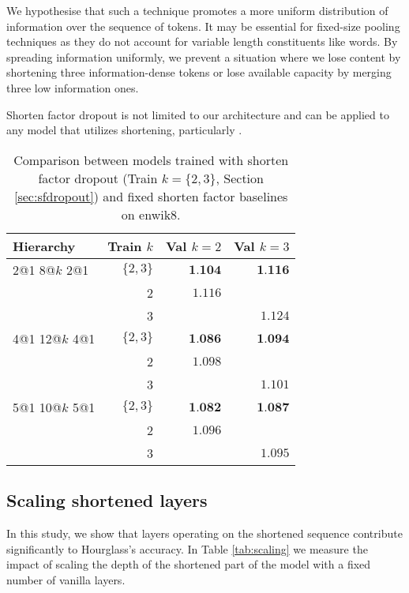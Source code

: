 \documentclass[11pt]{article}
\begin{document}
We hypothesise that such a technique promotes a more uniform distribution of information over the sequence of tokens. It may be essential for fixed-size pooling techniques as they do not account for variable length constituents like words. By spreading information uniformly, we prevent a situation where we lose content by shortening three information-dense tokens or lose available capacity by merging three low information ones.

Shorten factor dropout is not limited to our architecture and can be applied to any model that utilizes shortening, particularly \cite{dai2020funneltransformer}.

\begin{table}[ht!]
\small
\centering
\setlength{\tabcolsep}{0.8em}
\begin{tabular}{lrrr}
\hline
Hierarchy & Train $k$ & Val $k=2$ & Val $k=3$ \\
\hline
2@1 8@$k$ 2@1 & $\{2,3\}$ & $\textbf{1.104}$ & $\textbf{1.116}$ \\
              & 2 & $1.116$ &         \\
              & 3 &         & $1.124$ \\
\hline
4@1 12@$k$ 4@1 & $\{2,3\}$ & $\textbf{1.086}$ & $\textbf{1.094}$ \\
              & 2 & $1.098$ &         \\
              & 3 &         & $1.101$ \\
\hline
5@1 10@$k$ 5@1 & $\{2,3\}$ & $\textbf{1.082}$ & $\textbf{1.087}$ \\
              & 2 & $1.096$ &         \\
              & 3 &         & $1.095$ \\
\hline
\end{tabular}
\caption{Comparison between models trained with shorten factor dropout (Train $k=\{2,3\}$, Section \ref{sec:sfdropout}) and fixed shorten factor baselines on enwik8.}
\label{tab:sfdropout}
\end{table}

\vspace{-5mm}
\subsection{Scaling shortened layers}\label{sec:scaling}
In this study, we show that layers operating on the shortened sequence contribute significantly to Hourglass's accuracy. In Table \ref{tab:scaling} we measure the impact of scaling the depth of the shortened part of the model with a fixed number of vanilla layers.
\end{document}
